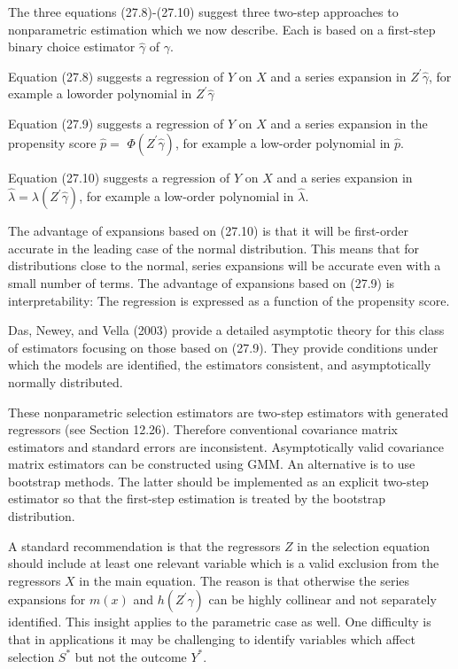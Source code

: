 \documentclass[10pt]{article}
\begin{document}
The three equations (27.8)-(27.10) suggest three two-step approaches to nonparametric estimation which we now describe. Each is based on a first-step binary choice estimator $\widehat{\gamma}$ of $\gamma$.

Equation (27.8) suggests a regression of $Y$ on $X$ and a series expansion in $Z^{\prime} \widehat{\gamma}$, for example a loworder polynomial in $Z^{\prime} \widehat{\gamma}$

Equation (27.9) suggests a regression of $Y$ on $X$ and a series expansion in the propensity score $\widehat{p}=$ $\Phi\left(Z^{\prime} \widehat{\gamma}\right)$, for example a low-order polynomial in $\hat{p}$.

Equation (27.10) suggests a regression of $Y$ on $X$ and a series expansion in $\hat{\lambda}=\lambda\left(Z^{\prime} \hat{\gamma}\right)$, for example a low-order polynomial in $\hat{\lambda}$.

The advantage of expansions based on (27.10) is that it will be first-order accurate in the leading case of the normal distribution. This means that for distributions close to the normal, series expansions will be accurate even with a small number of terms. The advantage of expansions based on (27.9) is interpretability: The regression is expressed as a function of the propensity score.

Das, Newey, and Vella (2003) provide a detailed asymptotic theory for this class of estimators focusing on those based on (27.9). They provide conditions under which the models are identified, the estimators consistent, and asymptotically normally distributed.

These nonparametric selection estimators are two-step estimators with generated regressors (see Section 12.26). Therefore conventional covariance matrix estimators and standard errors are inconsistent. Asymptotically valid covariance matrix estimators can be constructed using GMM. An alternative is to use bootstrap methods. The latter should be implemented as an explicit two-step estimator so that the first-step estimation is treated by the bootstrap distribution.

A standard recommendation is that the regressors $Z$ in the selection equation should include at least one relevant variable which is a valid exclusion from the regressors $X$ in the main equation. The reason is that otherwise the series expansions for $m(x)$ and $h\left(Z^{\prime} \gamma\right)$ can be highly collinear and not separately identified. This insight applies to the parametric case as well. One difficulty is that in applications it may be challenging to identify variables which affect selection $S^{*}$ but not the outcome $Y^{*}$.
\end{document}
